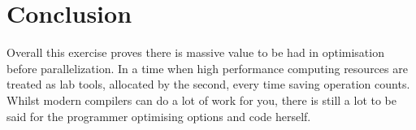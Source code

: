 \documentclass{article}
\begin{document}
\section{Conclusion}
Overall this exercise proves there is massive value to be had in optimisation before parallelization. In a time when high performance computing resources are treated as lab tools, allocated by the second, every time saving operation counts. Whilst modern compilers can do a lot of work for you, there is still a lot to be said for the programmer optimising options and code herself.
\end{document}
